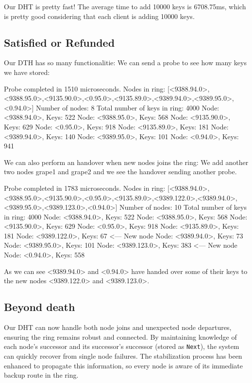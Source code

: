 \documentclass[a4paper, 11pt]{article}
\begin{document}
Our DHT is pretty fast! The average time to add 10000 keys is 6708.75ms, which is pretty good considering that each client is adding 10000 keys.

\subsection{Satisfied or Refunded}
Our DTH has so many functionalitie:
We can send a probe to see how many keys we have stored:

\begin{mylisting}
Probe completed in 1510 microseconds. Nodes in ring: [<9388.94.0>,<9388.95.0>,<9135.90.0>,<0.95.0>,<9135.89.0>,<9389.94.0>,<9389.95.0>,<0.94.0>]
Number of nodes: 8
Total number of keys in ring: 4000
Node: <9388.94.0>, Keys: 522
Node: <9388.95.0>, Keys: 568
Node: <9135.90.0>, Keys: 629
Node: <0.95.0>, Keys: 918
Node: <9135.89.0>, Keys: 181
Node: <9389.94.0>, Keys: 140
Node: <9389.95.0>, Keys: 101
Node: <0.94.0>, Keys: 941
\end{mylisting}

We can also perform an handover when new nodes joins the ring:
We add another two nodes grape1 and grape2 and we see the handover sending another probe.

\begin{mylisting}
Probe completed in 1783 microseconds. Nodes in ring: [<9388.94.0>,<9388.95.0>,<9135.90.0>,<0.95.0>,<9135.89.0>,<9389.122.0>,<9389.94.0>,<9389.95.0>,<9389.123.0>,<0.94.0>]
Number of nodes: 10
Total number of keys in ring: 4000
Node: <9388.94.0>, Keys: 522
Node: <9388.95.0>, Keys: 568
Node: <9135.90.0>, Keys: 629
Node: <0.95.0>, Keys: 918
Node: <9135.89.0>, Keys: 181
Node: <9389.122.0>, Keys: 67 <--- New node
Node: <9389.94.0>, Keys: 73
Node: <9389.95.0>, Keys: 101
Node: <9389.123.0>, Keys: 383 <--- New node
Node: <0.94.0>, Keys: 558
\end{mylisting}

As we can see <9389.94.0> and <0.94.0> have handed over some of their keys to the new nodes <9389.122.0> and <9389.123.0>.

\subsection{Beyond death}
Our DHT can now handle both node joins and unexpected node departures, ensuring the ring remains robust and connected. By maintaining knowledge of each node's successor and its successor's successor (stored as \texttt{Next}), the system can quickly recover from single node failures. The stabilization process has been enhanced to propagate this information, so every node is aware of its immediate backup route in the ring.
\end{document}
